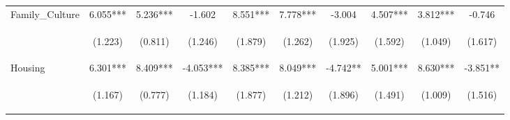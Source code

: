 \begin{tabular}{lccccccccc}
\noalign{\smallskip}Family_Culture & 6.055*** & 5.236*** & -1.602 & 8.551*** & 7.778*** & -3.004 & 4.507*** & 3.812*** & -0.746\\
 & \begin{footnotesize}(1.223)\end{footnotesize} & \begin{footnotesize}(0.811)\end{footnotesize} & \begin{footnotesize}(1.246)\end{footnotesize} & \begin{footnotesize}(1.879)\end{footnotesize} & \begin{footnotesize}(1.262)\end{footnotesize} & \begin{footnotesize}(1.925)\end{footnotesize} & \begin{footnotesize}(1.592)\end{footnotesize} & \begin{footnotesize}(1.049)\end{footnotesize} & \begin{footnotesize}(1.617)\end{footnotesize}\\
\noalign{\smallskip}Housing & 6.301*** & 8.409*** & -4.053*** & 8.385*** & 8.049*** & -4.742** & 5.001*** & 8.630*** & -3.851**\\
 & \begin{footnotesize}(1.167)\end{footnotesize} & \begin{footnotesize}(0.777)\end{footnotesize} & \begin{footnotesize}(1.184)\end{footnotesize} & \begin{footnotesize}(1.877)\end{footnotesize} & \begin{footnotesize}(1.212)\end{footnotesize} & \begin{footnotesize}(1.896)\end{footnotesize} & \begin{footnotesize}(1.491)\end{footnotesize} & \begin{footnotesize}(1.009)\end{footnotesize} & \begin{footnotesize}(1.516)\end{footnotesize}\\

\end{tabular}
